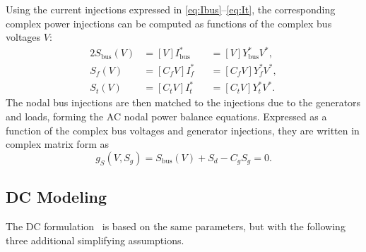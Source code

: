 \documentclass[12pt]{article}
\newcommand{\diag}[1]{\left[{#1}\right]}                %
\numberwithin{equation}{section}
\numberwithin{table}{section}
\numberwithin{figure}{section}
\begin{document}
Using the current injections expressed in \eqref{eq:Ibus}--\eqref{eq:It},
the corresponding complex power injections can be computed as functions of the complex bus voltages $V$:
\begin{alignat}{2}
  S_\mathrm{bus}(V)
  &= \diag{V}I_\mathrm{bus}^*
  &&= \diag{V}Y_\mathrm{bus}^* V^*, \label{eq:Sbus} \\
  S_f(V)
  &= \diag{C_f V}I_f^*
  &&= \diag{C_f V}Y_f^* V^*, \label{eq:Sf} \\
  S_t(V)
  &= \diag{C_t V}I_t^*
  &&= \diag{C_t V}Y_t^* V^*.  \label{eq:St}
\end{alignat}
The nodal bus injections are then matched to the injections due to the generators and loads,
forming the AC nodal power balance equations.
Expressed as a function of the complex bus voltages and generator injections,
they are written in complex matrix form as
\begin{equation}
  g_S( V, S_g) = S_\mathrm{bus}(V) + S_d - C_g S_g = 0.
  \label{eq:acpf}
\end{equation}

\subsection{DC Modeling}

The DC formulation~\cite{wood1996} is based on the same parameters,
but with the following three additional simplifying assumptions.
\end{document}
